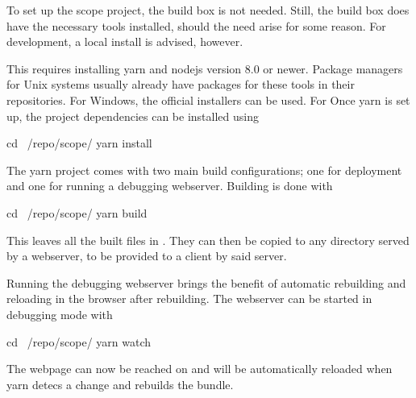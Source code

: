 To set up the scope project, the build box is not needed. Still, the build box
does  have the  necessary  tools installed,  should the  need  arise for  some
reason.  For development, a local install is advised, however.

This  requires installing  yarn  and  nodejs version  8.0  or newer.   Package
managers for  Unix systems usually  already have  packages for these  tools in
their repositories. For  Windows, the  official installers  can be  used.  For
Once yarn is set up, the project dependencies can be installed using
\begin{commandshell}
    cd ~/repo/scope/
    yarn install
\end{commandshell}
\noindent The yarn  project comes with two main  build configurations; one for
deployment and one for running a debugging webserver. Building is done with
\begin{commandshell}
    cd ~/repo/scope/
    yarn build
\end{commandshell}

This leaves all the built files in . They can then be
copied to any directory  served by a webserver, to be provided  to a client by
said server.

Running the debugging webserver brings the benefit of automatic rebuilding and
reloading in  the browser  after rebuilding. The webserver  can be  started in
debugging mode with
\begin{commandshell}
    cd ~/repo/scope/
    yarn watch
\end{commandshell}
The webpage  can now  be reached on   and  will be
automatically reloaded when yarn detecs a change and rebuilds the bundle.


